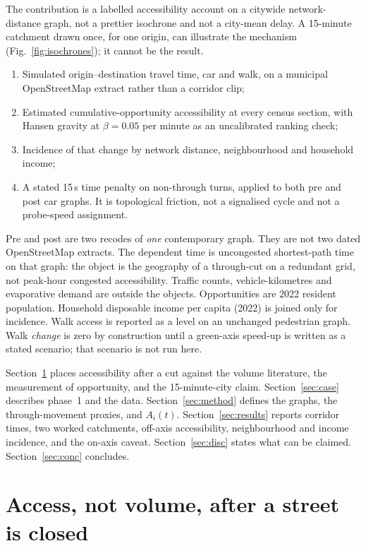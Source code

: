 \documentclass[a4paper,fleqn]{cas-dc}
\begin{document}
The contribution is a labelled accessibility account on a citywide
network-distance graph, not a prettier isochrone and not a city-mean delay.
A 15-minute catchment drawn once, for one origin, can illustrate the
mechanism (Fig.~\ref{fig:isochrones}); it cannot be the result.
\begin{enumerate}
\item Simulated origin--destination travel time, car and walk, on a municipal
OpenStreetMap extract rather than a corridor clip;
\item Estimated cumulative-opportunity accessibility at every census section,
with Hansen gravity at $\beta = 0.05$ per minute as an uncalibrated ranking
check;
\item Incidence of that change by network distance, neighbourhood and
household income;
\item A stated 15\,s time penalty on non-through turns, applied to both pre
and post car graphs. It is topological friction, not a signalised cycle and
not a probe-speed assignment.
\end{enumerate}
Pre and post are two recodes of \emph{one} contemporary graph. They are not
two dated OpenStreetMap extracts. The dependent time is uncongested
shortest-path time on that graph: the object is the geography of a
through-cut on a redundant grid, not peak-hour congested accessibility.
Traffic counts, vehicle-kilometres and evaporative demand are outside the
objects. Opportunities are 2022 resident population. Household disposable
income per capita (2022) is joined only for incidence. Walk access is
reported as a level on an unchanged pedestrian graph. Walk \emph{change} is
zero by construction until a green-axis speed-up is written as a stated
scenario; that scenario is not run here.

Section~\ref{sec:lit} places accessibility after a cut against the volume
literature, the measurement of opportunity, and the 15-minute-city claim.
Section~\ref{sec:case} describes phase~1 and the data.
Section~\ref{sec:method} defines the graphs, the through-movement proxies,
and $A_i(t)$. Section~\ref{sec:results} reports corridor times, two worked
catchments, off-axis accessibility, neighbourhood and income incidence, and
the on-axis caveat. Section~\ref{sec:disc} states what can be claimed.
Section~\ref{sec:conc} concludes.

\section{Access, not volume, after a street is closed}
\label{sec:lit}
\end{document}
